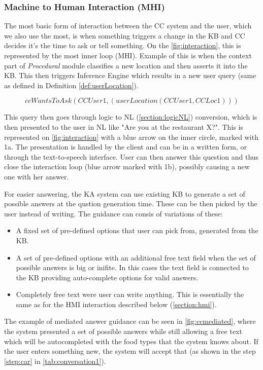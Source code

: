 \subsubsection{Machine to Human Interaction (MHI)}
\label{section:mhi}
The most basic form of interaction between the CC system and the user, which
we also use the most, is when something triggers a change in the KB and 
CC decides it's the time to ask or tell something. On the 
\autoref{fig:interaction}, this is represented by the most inner loop (MHI). 
Example of this is when the context part of \emph{Procedural} module classifies
a new location and then asserts it into the KB. This then triggers Inference 
Engine which results in a new user query (same as defined in Definition
\ref{def:userLocation}).

\begin{equation*}
	\label{eq:ccWantsLoc}
	ccWantsToAsk(CCUser1, (userLocation(CCUser1,CCLoc1)))
\end{equation*}

This query then goes through logic to NL (\autoref{section:logicNL}) 
conversion, which is then
presented to the user in NL like "Are you at the restaurant X?".
This is represented on \autoref{fig:interaction} with a blue arrow on the
inner circle, marked with 1a. The presentation is handled by the client and 
can be in a written form, or through the text-to-speech interface. User can then 
answer this question and thus close the interaction loop (blue arrow marked with
1b), possibly causing a new one with her answer. 

For easier answering, the KA system can use existing KB to generate a set of 
possible answers at the qustion generation time. These can be then picked by
the user instead of writing. The guidance can consis of variations of these:
\begin{itemize}
	\item A fixed set of pre-defined options that user can pick from, generated
	from the KB.
	\item A set of pre-defined options with an additional free text field when
	the set of possible answers is big or inifite. In this cases the text field
	is connected to the KB providing auto-complete options for valid answers.
	\item Completely free text were user can write anything. This is essentially
	the same as for the HMI interaction described below (\autoref{section:hmi}).
\end{itemize}

The example of mediated answer guidance can be seen in \autoref{fig:ccmediated},
where the system presented a set of possible answers while still allowing a 
free text 
which will be autocompleted with the food types that the system knows about. 
If the user enters something new, the system will accept that (as shown 
in the step \ref{step:car} in \autoref{tab:conversation1}).

